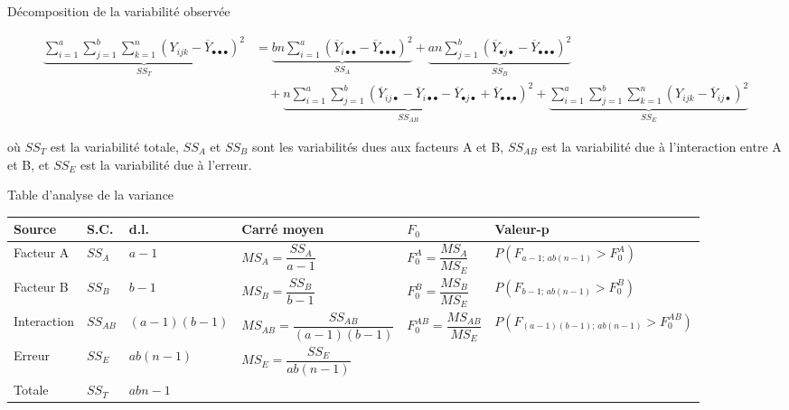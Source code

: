 \documentclass{BeamerTemplate}
\begin{document}
\begin{frame}[t]{Décomposition de la variabilité observée}

\small
\begin{align*}
\underbrace{\sum_{i=1}^{a}\sum_{j=1}^{b}\sum_{k=1}^{n}(Y_{ijk}-\overline{Y}_{\bullet\bullet\bullet})^2}_{SS_T}
&= \underbrace{bn\sum_{i=1}^{a}(\overline{Y}_{i\bullet\bullet}-\overline{Y}_{\bullet\bullet\bullet})^2}_{SS_A}
 + \underbrace{an\sum_{j=1}^{b}(\overline{Y}_{\bullet j\bullet}-\overline{Y}_{\bullet\bullet\bullet})^2}_{SS_B}\\
&\quad + \underbrace{n\sum_{i=1}^{a}\sum_{j=1}^{b}(\overline{Y}_{ij\bullet}-\overline{Y}_{i\bullet\bullet}
   -\overline{Y}_{\bullet j\bullet}+\overline{Y}_{\bullet\bullet\bullet})^2}_{SS_{AB}}
 + \underbrace{\sum_{i=1}^{a}\sum_{j=1}^{b}\sum_{k=1}^{n}(Y_{ijk}-\overline{Y}_{ij\bullet})^2}_{SS_E}
\end{align*}

où $SS_T$ est la variabilité \alert{totale}, $SS_A$ et $SS_B$ sont les variabilités
dues aux facteurs A et B, $SS_{AB}$ est la variabilité due à l'\alert{interaction}
entre A et B, et $SS_E$ est la variabilité due à l'\alert{erreur}.

\end{frame}

\begin{frame}[t]{Table d'analyse de la variance}

\begin{center}
\scriptsize
\renewcommand{\arraystretch}{2.1}
\begin{tabular}{llllll}
\toprule
Source & S.C. & d.l. & Carré moyen & $F_0$ & Valeur-p\\
\midrule
Facteur A & $SS_A$ & $a-1$ & $MS_A=\dfrac{SS_A}{a-1}$ & $F_0^A=\dfrac{MS_A}{MS_E}$
  & $P(F_{a-1;\,ab(n-1)}>F_0^A)$\\
Facteur B & $SS_B$ & $b-1$ & $MS_B=\dfrac{SS_B}{b-1}$ & $F_0^B=\dfrac{MS_B}{MS_E}$
  & $P(F_{b-1;\,ab(n-1)}>F_0^B)$\\
Interaction & $SS_{AB}$ & $(a-1)(b-1)$ & $MS_{AB}=\dfrac{SS_{AB}}{(a-1)(b-1)}$
  & $F_0^{AB}=\dfrac{MS_{AB}}{MS_E}$ & $P(F_{(a-1)(b-1);\,ab(n-1)}>F_0^{AB})$\\
Erreur & $SS_E$ & $ab(n-1)$ & $MS_E=\dfrac{SS_E}{ab(n-1)}$ & & \\
\midrule
Totale & $SS_T$ & $abn-1$ & & & \\
\bottomrule
\end{tabular}
\end{center}

\end{frame}
\end{document}

